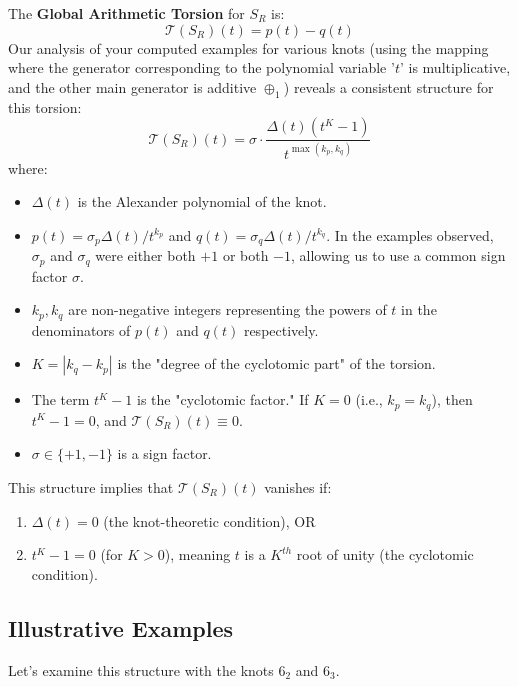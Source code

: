 \documentclass{article}[a4paper,12pt]
\begin{document}
The \textbf{Global Arithmetic Torsion} for $S_R$ is:
\[ \mathcal{T}(S_R)(t) = p(t) - q(t) \]
Our analysis of your computed examples for various knots (using the mapping where the generator corresponding to the polynomial variable '$t$' is multiplicative, and the other main generator is additive $\oplus_1$) reveals a consistent structure for this torsion:
\begin{equation} \label{eq:torsion_formula}
\mathcal{T}(S_R)(t) = \sigma \cdot \frac{\Delta(t)(t^K-1)}{t^{\max(k_p, k_q)}}
\end{equation}
where:
\begin{itemize}
    \item $\Delta(t)$ is the Alexander polynomial of the knot.
    \item $p(t) = \sigma_p \Delta(t)/t^{k_p}$ and $q(t) = \sigma_q \Delta(t)/t^{k_q}$. In the examples observed, $\sigma_p$ and $\sigma_q$ were either both $+1$ or both $-1$, allowing us to use a common sign factor $\sigma$.
    \item $k_p, k_q$ are non-negative integers representing the powers of $t$ in the denominators of $p(t)$ and $q(t)$ respectively.
    \item $K = |k_q - k_p|$ is the "degree of the cyclotomic part" of the torsion.
    \item The term $t^K-1$ is the "cyclotomic factor." If $K=0$ (i.e., $k_p=k_q$), then $t^K-1=0$, and $\mathcal{T}(S_R)(t) \equiv 0$.
    \item $\sigma \in \{+1, -1\}$ is a sign factor.
\end{itemize}
This structure implies that $\mathcal{T}(S_R)(t)$ vanishes if:
\begin{enumerate}
    \item $\Delta(t)=0$ (the knot-theoretic condition), OR
    \item $t^K-1=0$ (for $K>0$), meaning $t$ is a $K^{th}$ root of unity (the cyclotomic condition).
\end{enumerate}

\subsection{Illustrative Examples}

Let's examine this structure with the knots $6_2$ and $6_3$.
\end{document}
